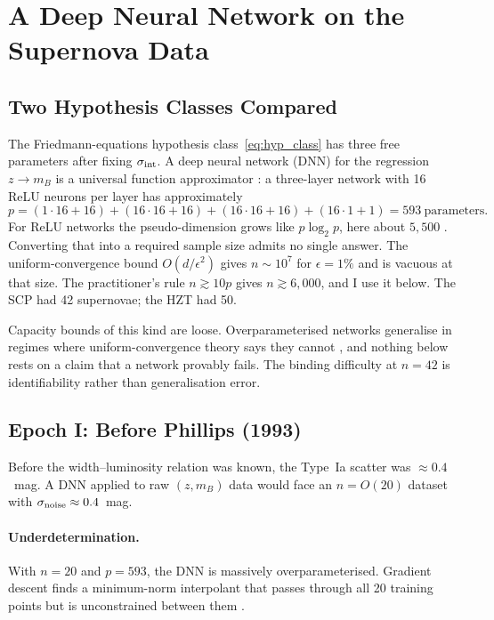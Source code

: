 \documentclass[12pt]{article}
\begin{document}
\section{A Deep Neural Network on the Supernova Data}
\label{sec:dnn}

\subsection{Two Hypothesis Classes Compared}

The Friedmann-equations hypothesis class~\eqref{eq:hyp_class} has three
free parameters after fixing $\sigma_{\rm int}$.  A deep neural
network (DNN) for the regression $z \to m_B$ is a universal function
approximator \citep{Hornik1989}: a three-layer network with 16 ReLU
neurons per layer has approximately
\[
  p = (1\cdot16+16) + (16\cdot16+16) + (16\cdot16+16) + (16\cdot1+1) = 593~\text{parameters}.
\]
For ReLU networks the pseudo-dimension grows like $p\log_2 p$, here about
$5{,}500$ \citep{Vapnik1998}.  Converting that into a required sample size
admits no single answer.  The uniform-convergence bound $O(d/\epsilon^2)$
gives $n\sim10^7$ for $\epsilon = 1\%$ and is vacuous at that size.  The
practitioner's rule $n \gtrsim 10p$ gives $n \gtrsim 6{,}000$, and I use it
below.  The SCP had 42 supernovae; the HZT had 50.

Capacity bounds of this kind are loose.  Overparameterised networks
generalise in regimes where uniform-convergence theory says they cannot
\citep{Belkin2019}, and nothing below rests on a claim that a network provably
fails.  The binding difficulty at $n = 42$ is identifiability rather than
generalisation error.

\subsection{Epoch I: Before Phillips (1993)}

Before the width--luminosity relation was known, the Type~Ia scatter
was $\approx 0.4$~mag.  A DNN applied to raw $(z, m_B)$ data would face
an $n=O(20)$ dataset with $\sigma_{\rm noise} \approx 0.4$~mag.

\paragraph{Underdetermination.}
With $n = 20$ and $p = 593$, the DNN is massively overparameterised.
Gradient descent finds a minimum-norm interpolant that passes through
all 20 training points but is unconstrained between them
\citep{Belkin2019}.
\end{document}
